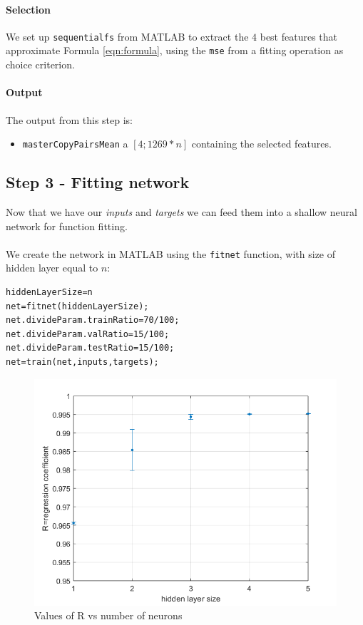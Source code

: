\documentclass[twocolumn,a4paper]{article}
\begin{document}
\paragraph{Selection} We set up \texttt{sequentialfs} from MATLAB to extract the $4$ best features that approximate Formula \ref{eqn:formula}, using the \texttt{mse} from a fitting operation as choice criterion.
\paragraph{Output} The output from this step is:
\begin{itemize}
    \item \texttt{masterCopyPairsMean} a $[4; 1269*n]$ containing the selected features.
\end{itemize}
\subsection{Step 3 - Fitting network}\label{sec:nnet} Now that we have our \textit{inputs} and \textit{targets} we can feed them into a shallow neural network for function fitting. 
\paragraph{} We create the network in MATLAB using the \texttt{fitnet} function, with size of hidden layer equal to $n$:
\begin{lstlisting}
hiddenLayerSize=n
net=fitnet(hiddenLayerSize);
net.divideParam.trainRatio=70/100;
net.divideParam.valRatio=15/100;
net.divideParam.testRatio=15/100;
net=train(net,inputs,targets);
\end{lstlisting}
\begin{figure}
    \centering
    \includegraphics[width=\linewidth]{images/r_perf_ci.png}
    \caption{Values of R vs number of neurons}
    \label{fig:r_vs_num_neur}
\end{figure}
\end{document}
